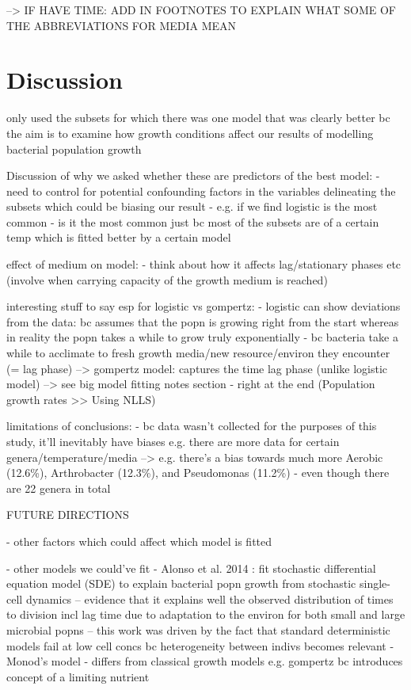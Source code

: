 \documentclass[11pt]{article}
\begin{document}
	
	
	
	--> IF HAVE TIME: ADD IN FOOTNOTES TO EXPLAIN WHAT SOME OF THE ABBREVIATIONS FOR MEDIA MEAN
	
	\newpage
	
	\section{Discussion}
	
	only used the subsets for which there was one model that was clearly better bc the aim is to examine how growth conditions affect our results of modelling bacterial population growth
	
	
	Discussion of why we asked whether these are predictors of the best model:
	- need to control for potential confounding factors in the variables delineating the subsets which could be biasing our result
	- e.g. if we find logistic is the most common - is it the most common just bc most of the subsets are of a certain temp which is fitted better by a certain model
	
	
	
	effect of medium on model:
	- think about how it affects lag/stationary phases etc (involve when carrying capacity of the growth medium is reached)
	
	
	interesting stuff to say esp for logistic vs gompertz:
	- logistic can show deviations from the data: bc assumes that the popn is growing right from the start whereas in reality the popn takes a while to grow truly exponentially
	- bc bacteria take a while to acclimate to fresh growth media/new resource/environ they encounter (= lag phase)
	--> gompertz model: captures the time lag phase (unlike logistic model)
	--> see big model fitting notes section - right at the end (Population growth rates >> Using NLLS)
	
	
	limitations of conclusions:
	- bc data wasn't collected for the purposes of this study, it'll inevitably have biases e.g. there are more data for certain genera/temperature/media
	--> e.g. there's a bias towards much more Aerobic (12.6\%), Arthrobacter (12.3\%), and Pseudomonas (11.2\%) - even though there are 22 genera in total
	
	
	
	
	FUTURE DIRECTIONS
	
	- other factors which could affect which model is fitted
	
	- other models we could've fit
	- Alonso et al. 2014 \cite{alonso2014modeling}: fit stochastic differential equation model (SDE) to explain bacterial popn growth from stochastic single-cell dynamics -- evidence that it explains well the observed distribution of times to division incl lag time due to adaptation to the environ for both small and large microbial popns -- this work was driven by the fact that standard deterministic models fail at low cell concs bc heterogeneity between indivs becomes relevant
	- Monod's model \cite{lobry1992monod} - differs from classical growth models e.g. gompertz bc introduces concept of a limiting nutrient
	
\end{document}
